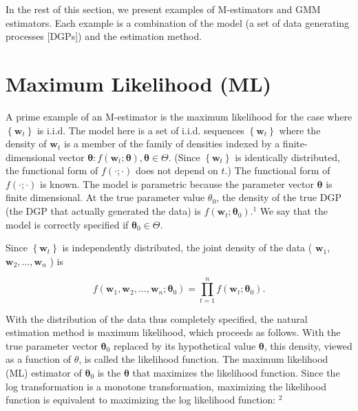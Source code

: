 \documentclass[10pt]{article}
\begin{document}
In the rest of this section, we present examples of M-estimators and GMM estimators. Each example is a combination of the model (a set of data generating processes [DGPs]) and the estimation method.

\section*{Maximum Likelihood (ML)}
A prime example of an M-estimator is the maximum likelihood for the case where $\left\{\mathbf{w}_{t}\right\}$ is i.i.d. The model here is a set of i.i.d. sequences $\left\{\mathbf{w}_{t}\right\}$ where the density of $\mathbf{w}_{t}$ is a member of the family of densities indexed by a finite-dimensional vector $\boldsymbol{\theta}: f\left(\mathbf{w}_{t} ; \boldsymbol{\theta}\right), \boldsymbol{\theta} \in \Theta$. (Since $\left\{\mathbf{w}_{t}\right\}$ is identically distributed, the functional form of $f(\cdot ; \cdot)$ does not depend on $t$.) The functional form of $f(\cdot ; \cdot)$ is known. The model is parametric because the parameter vector $\boldsymbol{\theta}$ is finite dimensional. At the true parameter value $\theta_{0}$, the density of the true DGP (the DGP that actually generated the data) is $f\left(\mathbf{w}_{t} ; \boldsymbol{\theta}_{0}\right) .{ }^{1}$ We say that the model is correctly specified if $\boldsymbol{\theta}_{0} \in \Theta$.

Since $\left\{\mathbf{w}_{t}\right\}$ is independently distributed, the joint density of the data ( $\mathbf{w}_{1}$, $\mathbf{w}_{2}, \ldots, \mathbf{w}_{n}$ ) is


\begin{equation*}
f\left(\mathbf{w}_{1}, \mathbf{w}_{2}, \ldots, \mathbf{w}_{n} ; \boldsymbol{\theta}_{0}\right)=\prod_{t=1}^{n} f\left(\mathbf{w}_{t} ; \boldsymbol{\theta}_{0}\right) . \tag{7.1.4}
\end{equation*}


With the distribution of the data thus completely specified, the natural estimation method is maximum likelihood, which proceeds as follows. With the true parameter vector $\boldsymbol{\theta}_{0}$ replaced by its hypothetical value $\boldsymbol{\theta}$, this density, viewed as a function of $\theta$, is called the likelihood function. The maximum likelihood (ML) estimator of $\boldsymbol{\theta}_{0}$ is the $\boldsymbol{\theta}$ that maximizes the likelihood function. Since the log transformation is a monotone transformation, maximizing the likelihood function is equivalent to maximizing the log likelihood function: ${ }^{2}$
\end{document}

